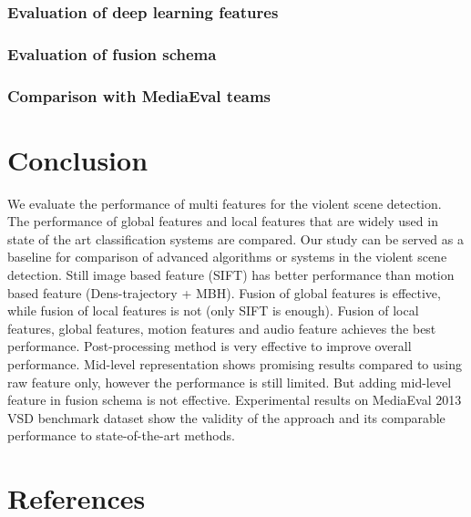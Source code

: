 \documentclass[review]{elsarticle}
\begin{document}
\subsubsection{Evaluation of deep learning features}
\subsubsection{Evaluation of fusion schema}
\subsubsection{Comparison with MediaEval teams}
\section{Conclusion}
We evaluate the performance of multi features for the violent scene detection. The performance of global features and local features that are widely used in state of the art classification systems are compared. Our study can be served as a baseline for comparison of advanced algorithms or systems in the violent scene detection. Still image based feature (SIFT) has better performance than motion based feature (Dens-trajectory + MBH).  Fusion of global features is effective, while fusion of local features is not (only SIFT is enough). Fusion of local features, global features, motion features and audio feature achieves the best performance. Post-processing method is very effective to improve overall performance. Mid-level representation shows promising results compared to using raw feature only, however the performance is still limited. But adding mid-level feature in fusion schema is not effective. Experimental results on MediaEval 2013 VSD benchmark dataset show the validity of the approach and its comparable performance to state-of-the-art methods.

\section*{References}


\end{document}

